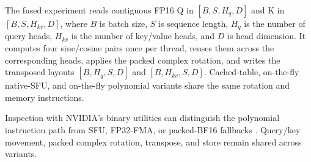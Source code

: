 The fused experiment reads contiguous FP16 Q in $[B,S,H_q,D]$ and K in
$[B,S,H_{kv},D]$, where $B$ is batch size, $S$ is sequence length, $H_q$ is the
number of query heads, $H_{kv}$ is the number of key/value heads, and $D$ is
head dimension. It computes four sine/cosine pairs once per thread, reuses them
across the corresponding heads, applies the packed complex rotation, and writes
the transposed layouts $[B,H_q,S,D]$ and $[B,H_{kv},S,D]$. Cached-table,
on-the-fly native-SFU, and on-the-fly polynomial variants share the same
rotation and memory instructions.

Inspection with NVIDIA's binary utilities can distinguish the polynomial
instruction path from SFU, FP32-FMA, or packed-BF16 fallbacks
\cite{nvidia2026binaryutilities}. Query/key movement, packed complex rotation,
transpose, and store remain shared across variants.

\FloatBarrier
